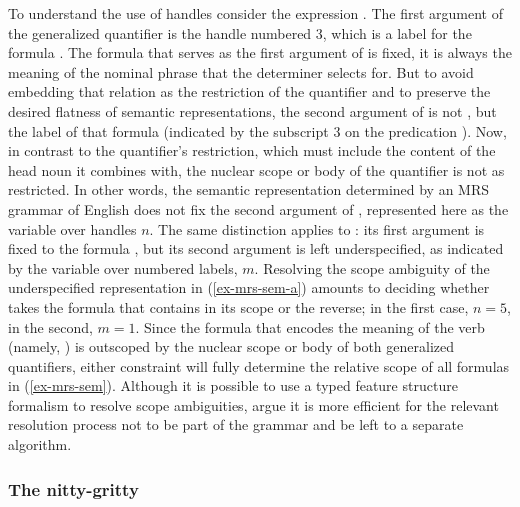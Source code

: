 \documentclass[output=paper]{langsci/langscibook}
\begin{document}
To understand the use of handles consider the expression . The first argument of the generalized quantifier is the handle numbered 3, which is a label for the formula . The formula that serves as the first argument of  is fixed, it is always the meaning of the nominal phrase that the determiner selects for. But to avoid embedding that relation as the restriction of the quantifier and to preserve the desired flatness of semantic representations, the second argument of  is not , but the label of that formula (indicated by the subscript $3$ on the predication ). Now, in contrast to the quantifier's restriction, which must include the content of the head noun it combines with, the nuclear scope or body of the quantifier is not as restricted. In other words, the semantic representation determined by an MRS grammar of English does not fix the second argument of , represented here as the variable over handles $n$. The same distinction applies to : its first argument is fixed to the formula , but its second argument is left underspecified, as indicated by the variable over numbered labels, $m$. Resolving the scope ambiguity of the underspecified representation in (\ref{ex-mrs-sem-a}) amounts to deciding whether  takes the formula that contains  in its scope or the reverse; in the first case, $n=5$, in the second, $m=1$. Since the formula that encodes the meaning of the verb (namely, \mbox{)} is outscoped by the nuclear scope or body of both generalized quantifiers, either constraint will fully determine the relative scope of all formulas in (\ref{ex-mrs-sem}). Although it is possible to use a typed feature structure formalism to resolve scope ambiguities, \citet[309--311]{Copestakeetal1995} argue it is more efficient for the relevant resolution process not to be part of the grammar and be left to a separate algorithm.



\subsubsection{The nitty-gritty}
\end{document}
